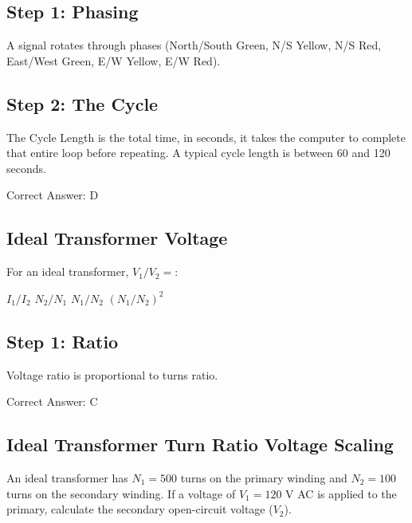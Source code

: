 \begin{solution}

\subsection*{Step 1: Phasing}
A signal rotates through phases (North/South Green, N/S Yellow, N/S Red, East/West Green, E/W Yellow, E/W Red).

\subsection*{Step 2: The Cycle}
The Cycle Length is the total time, in seconds, it takes the computer to complete that entire loop before repeating. A typical cycle length is between 60 and 120 seconds.

Correct Answer: D
\end{solution}

\clearpage

\subsection{Ideal Transformer Voltage}

For an ideal transformer, $V_1/V_2 = $:

\begin{choices}
    \choice $I_1/I_2$
    \choice $N_2/N_1$
    \correctchoice $N_1/N_2$
    \choice $(N_1/N_2)^2$
\end{choices}

\begin{solution}

\subsection*{Step 1: Ratio}
Voltage ratio is proportional to turns ratio.

Correct Answer: C
\end{solution}

\clearpage

\subsection{Ideal Transformer Turn Ratio Voltage Scaling}

An ideal transformer has $N_1 = 500$ turns on the primary winding and $N_2 = 100$ turns on the secondary winding. If a voltage of $V_1 = 120\text{ V}$ AC is applied to the primary, calculate the secondary open-circuit voltage ($V_2$).

